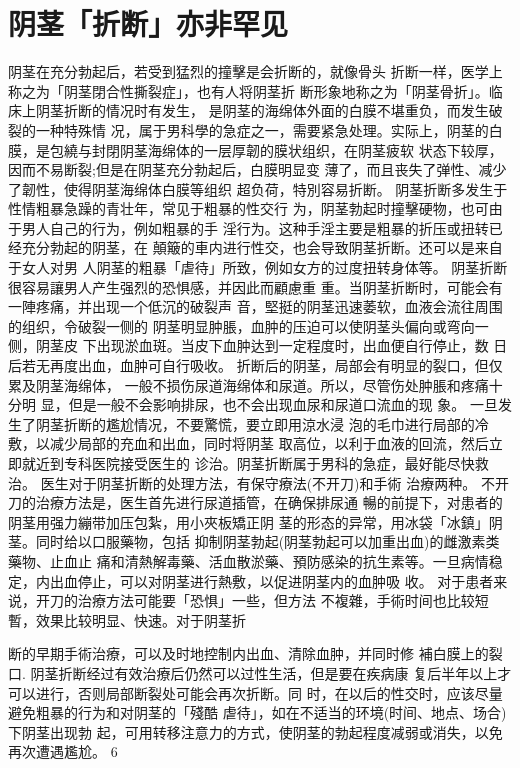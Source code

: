 \documentclass[12pt,UTF8]{ctexbook}
\begin{document}
\section{阴茎「折断」亦非罕见}
阴茎在充分勃起后，若受到猛烈的撞擊是会折断的，就像骨头
折断一样，医学上称之为「阴茎閉合性撕裂症」，也有人将阴茎折
断形象地称之为「阴茎骨折」。临床上阴茎折断的情况时有发生，
是阴茎的海绵体外面的白膜不堪重负，而发生破裂的一种特殊情
况，属于男科學的急症之一，需要紧急处理。实际上，阴茎的白
膜，是包繞与封閉阴茎海绵体的一层厚韌的膜状组织，在阴茎疲软
状态下较厚，因而不易断裂;但是在阴茎充分勃起后，白膜明显变
薄了，而且丧失了弹性、减少了韌性，使得阴茎海绵体白膜等组织
超负荷，特別容易折断。
阴茎折断多发生于性情粗暴急躁的青壮年，常见于粗暴的性交行
为，阴茎勃起时撞擊硬物，也可由于男人自己的行为，例如粗暴的手
淫行为。这种手淫主要是粗暴的折压或扭转已经充分勃起的阴茎，在
顛簸的車内进行性交，也会导致阴茎折断。还可以是来自于女人对男
人阴茎的粗暴「虐待」所致，例如女方的过度扭转身体等。
阴茎折断很容易讓男人产生强烈的恐惧感，并因此而顧慮重
重。当阴茎折断时，可能会有一陣疼痛，并出现一个低沉的破裂声
音，堅挺的阴茎迅速萎软，血液会流往周围的组织，令破裂一侧的
阴茎明显肿脹，血肿的压迫可以使阴茎头偏向或弯向一侧，阴茎皮
下出现淤血斑。当皮下血肿达到一定程度时，出血便自行停止，数
日后若无再度出血，血肿可自行吸收。
折断后的阴茎，局部会有明显的裂口，但仅累及阴茎海绵体，
一般不损伤尿道海绵体和尿道。所以，尽管伤处肿脹和疼痛十分明
显，但是一般不会影响排尿，也不会出现血尿和尿道口流血的现
象。
一旦发生了阴茎折断的尷尬情况，不要驚慌，要立即用涼水浸
泡的毛巾进行局部的冷敷，以减少局部的充血和出血，同时将阴茎
取高位，以利于血液的回流，然后立即就近到专科医院接受医生的
诊治。阴茎折断属于男科的急症，最好能尽快救治。
医生对于阴茎折断的处理方法，有保守療法(不开刀)和手術
治療两种。
不开刀的治療方法是，医生首先进行尿道插管，在确保排尿通
暢的前提下，对患者的阴茎用强力繃带加压包紮，用小夾板矯正阴
茎的形态的异常，用冰袋「冰鎮」阴茎。同时给以口服藥物，包括
抑制阴茎勃起(阴茎勃起可以加重出血)的雌激素类藥物、止血止
痛和清熱解毒藥、活血散淤藥、預防感染的抗生素等。一旦病情稳
定，内出血停止，可以对阴茎进行熱敷，以促进阴茎内的血肿吸
收。
对于患者来说，开刀的治療方法可能要「恐惧」一些，但方法
不複雜，手術时间也比较短暫，效果比较明显、快速。对于阴茎折

断的早期手術治療，可以及时地控制内出血、清除血肿，并同时修
補白膜上的裂口.
阴茎折断经过有效治療后仍然可以过性生活，但是要在疾病康
复后半年以上才可以进行，否则局部断裂处可能会再次折断。同
时，在以后的性交时，应该尽量避免粗暴的行为和对阴茎的「殘酷
虐待」，如在不适当的环境(时间、地点、场合)下阴茎出现勃
起，可用转移注意力的方式，使阴茎的勃起程度减弱或消失，以免
再次遭遇尷尬。
6
\end{document}
